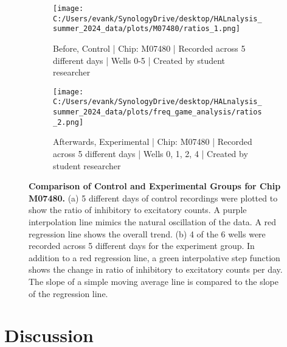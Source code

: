 \documentclass{article} %
\begin{document}
\begin{figure}
    \centering
    \hfill
    \begin{subfigure}[b]{0.48\textwidth}
        \centering
        \texttt{[image: C:/Users/evank/SynologyDrive/desktop/HALnalysis\_summer\_2024\_data/plots/M07480/ratios\_1.png]}
        \caption{Before, Control | Chip: M07480 | Recorded across 5 different days | Wells 0-5 | Created by student researcher}
    \end{subfigure}
    \hspace{\fill}
    \begin{subfigure}[b]{0.48\textwidth}
        \centering
        \texttt{[image: C:/Users/evank/SynologyDrive/desktop/HALnalysis\_summer\_2024\_data/plots/freq\_game\_analysis/ratios\_2.png]}
        \caption{Afterwards, Experimental | Chip: M07480 | Recorded across 5 different days | Wells 0, 1, 2, 4 | Created by student researcher}
    \end{subfigure}
    \caption{\textbf{Comparison of Control and Experimental Groups for Chip M07480.} (a) 5 different days of control recordings were plotted to show the ratio of inhibitory to excitatory counts. A purple interpolation line mimics the natural oscillation of the data. A red regression line shows the overall trend. (b) 4 of the 6 wells were recorded across 5 different days for the experiment group. In addition to a red regression line, a green interpolative step function shows the change in ratio of inhibitory to excitatory counts per day. The slope of a simple moving average line is compared to the slope of the regression line.}
\end{figure}




\section{Discussion}
\end{document}
